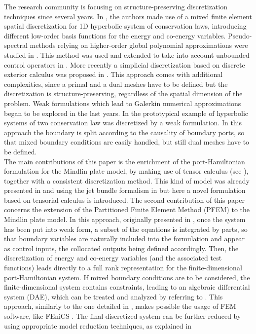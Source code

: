 \documentclass[preprint,12pt]{elsarticle}
\newcommand{\RevOne}[1]{\textcolor{blue!80!black}{#1}}
\begin{document}
	The research community is focusing on structure-preserving discretization techniques since several years. In \cite{Golo}, the authors made use of a mixed finite element spatial discretization for 1D hyperbolic system of conservation laws, introducing different low-order basis functions for the energy and co-energy variables. Pseudo-spectral methods relying on higher-order global polynomial approximations were studied in \cite{moulla:hal-01625008}. This method was used and extended to take into account unbounded control operators in \cite{articleFlavio}. More recently a simplicial discretization based on discrete exterior calculus was proposed in \cite{SESLIJA20121509}. This approach comes with additional complexities, since a primal and a dual meshes have to be defined but the discretization is structure-preserving, regardless of the spatial dimension of the problem. Weak formulations which lead to Galerkin numerical approximations began to be explored in the last years. In \cite{WeakForm_Kot} the prototypical example of hyperbolic systems of two conservation law was discretized by a weak formulation. In this approach the boundary is split according to the causality of boundary ports, so that mixed boundary conditions are easily handled, but still dual meshes have to be defined.  \\
	
	The main contributions of this paper is the enrichment of the port-Hamiltonian formulation for the Mindlin plate model, by making use of tensor calculus (see \cite[Chapter~16]{Grinfield}), together with a consistent discretization method.  This kind of model was already presented in \cite{MacchelliMindlin} and \RevOne{using the jet bundle formalism in \cite{jetMin}} but here a novel formulation based on tensorial calculus is introduced.  The second contribution of this paper concerns the extension of the Partitioned Finite Element Method (PFEM) to the Mindlin plate model. In this approach, originally presented in \cite{CardosoRibeiro2018}, once the system has been put into weak form, a subset of the equations is integrated by parts, so that boundary variables are naturally included into the formulation and appear as control inputs, the collocated outputs being defined accordingly. Then, the discretization of energy and co-energy variables (and the associated test functions) leads directly to a full rank representation for the finite-dimensional port-Hamiltonian system. If mixed boundary conditions are to be considered, the finite-dimensional system contains constraints, leading to an algebraic differential system (DAE), which can be treated and analyzed by referring to \cite{vanderSchaft2013, beattie2018linear}. This approach, similarly to the one detailed in \cite{WeakForm_Kot}, makes possible the usage of FEM software, like FEniCS \cite{LoggMardalEtAl2012}. The final discretized system can be further reduced by using appropriate model reduction techniques, as explained in \cite{TONG20132727, Mehrmann2018}  \\
	
\end{document}
